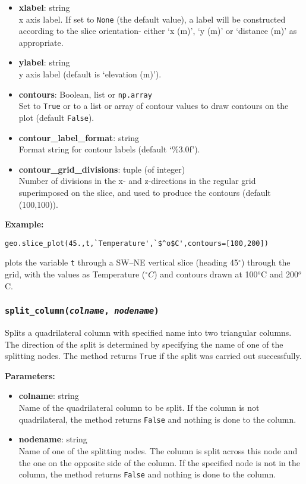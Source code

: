 \begin{itemize}
\item \textbf{xlabel}: string\\
  x axis label.  If set to \texttt{None} (the default value), a label will be constructed according to the slice orientation- either `x (m)', `y (m)' or `distance (m)' as appropriate.
\item \textbf{ylabel}: string\\
  y axis label (default is `elevation (m)').
\item \textbf{contours}: Boolean, list or \texttt{np.array}\\
  Set to \texttt{True} or to a list or array of contour values to draw contours on the plot (default \texttt{False}).
\item \textbf{contour\_label\_format}: string\\
  Format string for contour labels (default `\%3.0f').
\item \textbf{contour\_grid\_divisions}: tuple (of integer)\\
  Number of divisions in the x- and z-directions in the regular grid superimposed on the slice, and used to produce the contours (default (100,100)).
\end{itemize}

\textbf{Example:}

\begin{verbatim}
geo.slice_plot(45.,t,`Temperature',`$^o$C',contours=[100,200])
\end{verbatim}

plots the variable \texttt{t} through a SW--NE vertical slice (heading 45$^{\circ}$) through the grid, with the values as Temperature ($^{\circ}C$) and contours drawn at 100$^o$C and 200$^o$C.

\subsubsection{\texttt{split\_column(\emph{colname}, \emph{nodename})}}

Splits a quadrilateral column with specified name into two triangular columns.  The direction of the split is determined
by specifying the name of one of the splitting nodes.  The method returns \texttt{True} if the split was carried out successfully.

\textbf{Parameters:}
\begin{itemize}
\item \textbf{colname}: string\\
  Name of the quadrilateral column to be split.  If the column is not quadrilateral, the method returns \texttt{False} and nothing is done to the column.
\item \textbf{nodename}: string\\
  Name of one of the splitting nodes.  The column is split across this node and the one on the opposite side of the column.  If the specified node is not in the column, the method returns \texttt{False} and nothing is done to the column.
\end{itemize}

